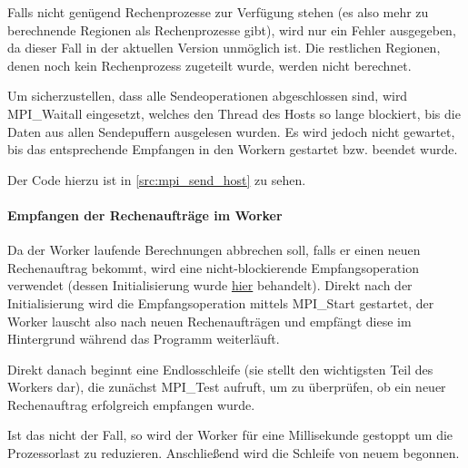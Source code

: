 
Falls nicht genügend Rechenprozesse zur Verfügung stehen (es also mehr zu berechnende Regionen als Rechenprozesse gibt), wird nur ein Fehler ausgegeben, da dieser Fall in der aktuellen Version unmöglich ist. Die restlichen Regionen, denen noch kein Rechenprozess zugeteilt wurde, werden nicht berechnet.

Um sicherzustellen, dass alle Sendeoperationen abgeschlossen sind, wird MPI\_Waitall eingesetzt, welches den Thread des Hosts so lange blockiert, bis die Daten aus allen Sendepuffern ausgelesen wurden. Es wird jedoch nicht gewartet, bis das entsprechende Empfangen in den Workern gestartet bzw. beendet wurde.

Der Code hierzu ist in \autoref{src:mpi_send_host} zu sehen.

\begin{figure}[h!]
	
\end{figure}

\paragraph{Empfangen der Rechenaufträge im Worker}\label{para:recv_worker}

Da der Worker laufende Berechnungen abbrechen soll, falls er einen neuen Rechenauftrag bekommt, wird eine nicht-blockierende Empfangsoperation verwendet (dessen Initialisierung wurde \hyperref[para:persistent_init]{hier} behandelt). Direkt nach der Initialisierung wird die Empfangsoperation mittels MPI\_Start gestartet, der Worker lauscht also nach neuen Rechenaufträgen und empfängt diese im Hintergrund während das Programm weiterläuft.

Direkt danach beginnt eine Endlosschleife (sie stellt den wichtigsten Teil des Workers dar), die zunächst MPI\_Test aufruft, um zu überprüfen, ob ein neuer Rechenauftrag erfolgreich empfangen wurde.

Ist das nicht der Fall, so wird der Worker für eine Millisekunde gestoppt um die Prozessorlast zu reduzieren. Anschließend wird die Schleife von neuem begonnen.

